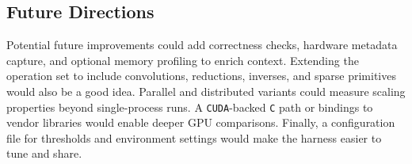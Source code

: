 \documentclass[a4paper,12pt]{article}
\begin{document}
\subsection{Future Directions}
Potential future improvements could add correctness checks, hardware metadata capture, and optional memory profiling to enrich context. Extending the operation set to include convolutions, reductions, inverses, and sparse primitives would also be a good idea. Parallel and distributed variants could measure scaling properties beyond single-process runs. A \texttt{CUDA}-backed \texttt{C} path or bindings to vendor libraries would enable deeper GPU comparisons. Finally, a configuration file for thresholds and environment settings would make the harness easier to tune and share.
\end{document}
